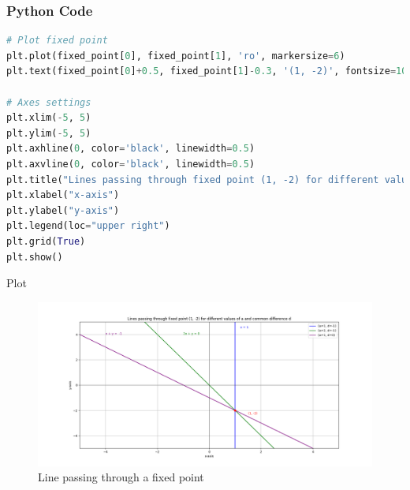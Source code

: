 \documentclass{beamer}
\begin{document}
\begin{frame}[fragile]
    \frametitle{Python Code}
    \begin{lstlisting}[language=Python]        
# Plot fixed point
plt.plot(fixed_point[0], fixed_point[1], 'ro', markersize=6)
plt.text(fixed_point[0]+0.5, fixed_point[1]-0.3, '(1, -2)', fontsize=10, color='red')

# Axes settings
plt.xlim(-5, 5)
plt.ylim(-5, 5)
plt.axhline(0, color='black', linewidth=0.5)
plt.axvline(0, color='black', linewidth=0.5)
plt.title("Lines passing through fixed point (1, -2) for different values of a and common difference d")
plt.xlabel("x-axis")
plt.ylabel("y-axis")
plt.legend(loc="upper right")
plt.grid(True)
plt.show()
    \end{lstlisting}
\end{frame}

\begin{frame}{Plot}
    \begin{figure}
        \centering
        \includegraphics[width=0.9\columnwidth]{../figs/figure_py.png}
        \caption{Line passing through a fixed point}
        \label{fig:final_plot}
    \end{figure}
\end{frame}
\end{document}
